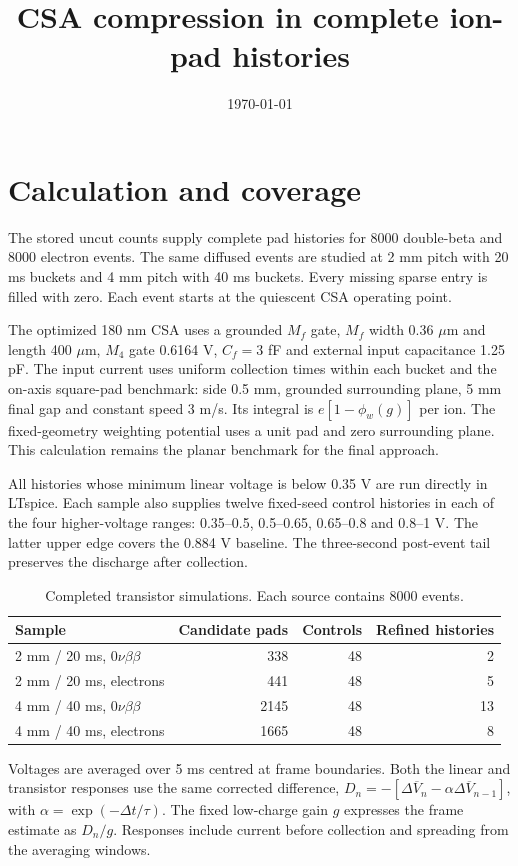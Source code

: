 \documentclass[11pt,a4paper]{article}
\title{CSA compression in complete ion-pad histories}
\date{\today}
\begin{document}
\maketitle
\section{Calculation and coverage}
The stored uncut counts supply complete pad histories for 8000 double-beta and
8000 electron events. The same diffused events are studied at 2 mm pitch with
20 ms buckets and 4 mm pitch with 40 ms buckets. Every missing sparse entry is
filled with zero. Each event starts at the quiescent CSA operating point.

The optimized 180 nm CSA uses a grounded $M_f$ gate, $M_f$ width 0.36 $\mu$m and
length 400 $\mu$m, $M_4$ gate 0.6164 V, $C_f=3$ fF and external input
capacitance 1.25 pF. The input current uses uniform collection times within each
bucket and the on-axis square-pad benchmark: side 0.5 mm, grounded surrounding
plane, 5 mm final gap and constant speed 3 m/s. Its integral is
$e[1-\phi_w(g)]$ per ion. The fixed-geometry weighting potential uses a unit pad
and zero surrounding plane. This calculation remains the planar benchmark for
the final approach.

All histories whose minimum linear voltage is below 0.35 V are run directly
in LTspice. Each sample also supplies twelve fixed-seed control histories in
each of the four higher-voltage ranges: 0.35--0.5, 0.5--0.65, 0.65--0.8 and
0.8--1 V. The latter upper edge covers the 0.884 V baseline. The three-second
post-event tail preserves the discharge after collection.

\begin{table}[ht]\centering
\begin{tabular}{lrrr}\toprule
Sample & Candidate pads & Controls & Refined histories\\\midrule
2 mm / 20 ms, $0\nu\beta\beta$ & 338 & 48 & 2 \\
2 mm / 20 ms, electrons & 441 & 48 & 5 \\
4 mm / 40 ms, $0\nu\beta\beta$ & 2145 & 48 & 13 \\
4 mm / 40 ms, electrons & 1665 & 48 & 8 \\
\bottomrule\end{tabular}
\caption{Completed transistor simulations. Each source contains 8000 events.}
\end{table}

Voltages are averaged over 5 ms centred at frame boundaries. Both the linear
and transistor responses use the same corrected difference,
$D_n=-[\Delta\overline V_n-\alpha\Delta\overline V_{n-1}]$, with
$\alpha=\exp(-\Delta t/\tau)$. The fixed low-charge gain $g$ expresses the
frame estimate as $D_n/g$. Responses include current before collection and
spreading from the averaging windows.
\end{document}
